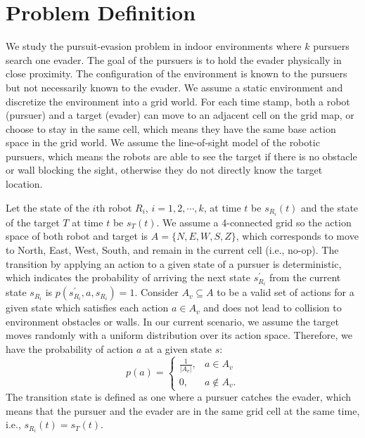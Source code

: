 \documentclass[../main.tex]{subfiles}
\begin{document}
\section{Problem Definition} \label{sec:prob_def}
We study the pursuit-evasion problem in indoor environments where $k$ pursuers search one evader. The goal of the pursuers is to hold the evader physically in close proximity.
The configuration of the environment is known to the pursuers but not necessarily known to the evader. We assume a static environment and discretize the environment into a grid world. For each time stamp, both a robot (pursuer) and a target (evader) can move to an adjacent cell on the grid map, or choose to stay in the same cell, which means they have the same base action space in the grid world. We assume the line-of-sight model of the robotic pursuers, which means the robots are able to see the target if there is no obstacle or wall blocking the sight, otherwise they do not directly know
the target location.

Let the state of the $i$th robot $R_i$, $i = 1, 2, \cdots, k$, at time $t$ be $s_{R_i}(t)$ and the state of the target $T$ at time $t$ be $s_T(t)$. We assume a 4-connected grid so the action space of both robot and target is $A = \{N, E, W, S, Z \}$,
which corresponds to move to North, East, West, South, and remain in the current cell (i.e., no-op). The transition by applying an action to a given state of a pursuer is deterministic, which indicates the probability of arriving the next state ${s^\prime_{R_i}}$ from the current state $s_{R_i}$ is $p({s^\prime_{R_i}}, a, {s_{R_i}}) = 1$. Consider $A_v \subseteq A$ to be a valid set of actions for a given state which satisfies each action $a \in A_v$ and does not lead to collision to environment obstacles or walls. In our current scenario, we assume the target moves randomly with a uniform distribution over its action space. Therefore, we have the probability of action $a$ at a given state $s$:
\begin{equation}
p(a) = \begin{cases}
    \frac{1}{|A_v|}, & a \in A_v \\
    0, & a \not \in A_v.
    \end{cases}
\end{equation}
The transition state is defined as one where a pursuer catches the evader, which means that the pursuer and the evader are in the same grid cell at the same time, i.e., $s_{R_i}(t) = s_T(t)$. 
\end{document}
